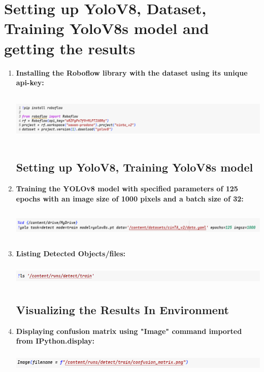 \documentclass[12 pt]{report}
\begin{document}
\section{Setting up YoloV8, Dataset, Training YoloV8s model and getting the results}
 {
  \begin{enumerate}
    \item \textbf{Installing the Roboflow library with the dataset using its unique api-key:}
          \begin{center}
            \includegraphics[width=17cm, height=2.5cm]{Pip insall roboflow.png}
          \end{center}
          \subsection{Setting up YoloV8, Training YoloV8s model}
    \item \textbf{Training the YOLOv8 model with specified parameters of 125 epochs with an image size of 1000 pixels and a batch size of 32:}
          \begin{center}
            \includegraphics[width=17cm, height=1.5cm]{Training Yolov8model.png}
          \end{center}
    \item \textbf{Listing Detected Objects/files:}
          \begin{center}
            \includegraphics[width=17cm, height=1cm]{Listing out the files created after trining .png}
          \end{center}

          \vspace{1.34cm}
          \subsection{Visualizing the Results In Environment}
    \item \textbf{Displaying confusion matrix using "Image" command imported from IPython.display:}
          \begin{center}
            \includegraphics[width=17cm, height=1cm]{displaying the confusion matrix in environment.png}
          \end{center}


\end{enumerate}}
\end{document}
